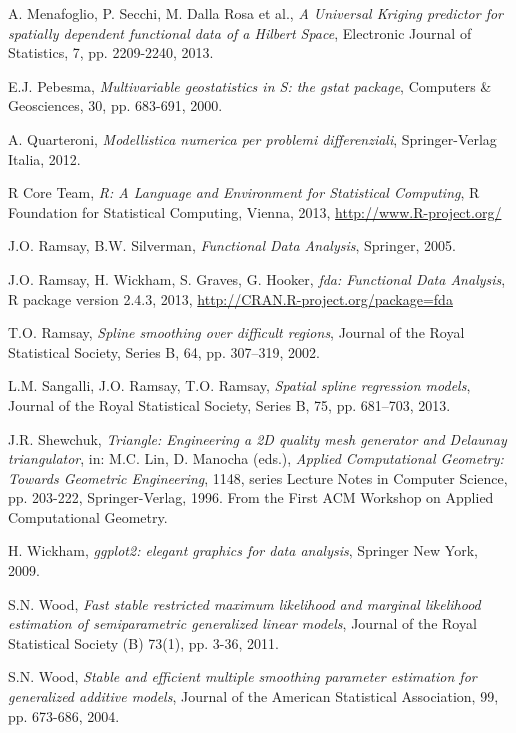 \documentclass[a4paper,11pt,twoside,openright]{book}							%
\begin{document}
\begin{thebibliography}{99}
A. Menafoglio, P. Secchi, M. Dalla Rosa et al., \emph{A Universal Kriging predictor for spatially dependent functional data of a Hilbert Space}, Electronic Journal of Statistics, 7, pp. 2209-2240, 2013.

E.J. Pebesma, \emph{Multivariable geostatistics in S: the gstat package}, Computers \& Geosciences, 30, pp. 683-691, 2000.

A. Quarteroni, \emph{Modellistica numerica per problemi differenziali}, Springer-Verlag Italia, 2012.

R Core Team, \emph{R: A Language and Environment for Statistical Computing}, R Foundation for Statistical Computing, Vienna, 2013, \href{http://www.R-project.org/}{http://www.R-project.org/}

J.O. Ramsay, B.W. Silverman, \emph{Functional Data Analysis}, Springer, 2005.

J.O. Ramsay, H. Wickham, S. Graves, G. Hooker, \emph{fda: Functional Data Analysis}, R package version 2.4.3, 2013, \href{http://CRAN.R-project.org/package=fda}{http://CRAN.R-project.org/package=fda}

T.O. Ramsay, \emph{Spline smoothing over difficult regions}, Journal of the Royal Statistical Society, Series B, 64, pp. 307–319, 2002.


L.M. Sangalli, J.O. Ramsay, T.O. Ramsay, \emph{Spatial spline regression models}, Journal of the Royal Statistical Society, Series B, 75, pp. 681–703, 2013.

J.R. Shewchuk, \emph{Triangle: Engineering a 2D quality mesh generator and Delaunay triangulator}, in: M.C. Lin, D. Manocha (eds.), \emph{Applied Computational Geometry: Towards Geometric Engineering}, 1148, series Lecture Notes in Computer Science, pp. 203-222, Springer-Verlag, 1996. From the First ACM Workshop on Applied Computational Geometry.

H. Wickham, \emph{ggplot2: elegant graphics for data analysis}, Springer New York, 2009.

S.N. Wood, \emph{Fast stable restricted maximum likelihood and marginal likelihood estimation of semiparametric generalized linear models}, Journal of the Royal Statistical Society (B) 73(1), pp. 3-36, 2011.

S.N. Wood, \emph{Stable and efficient multiple smoothing parameter estimation for generalized additive models}, Journal of the American Statistical Association, 99, pp. 673-686, 2004.


\end{thebibliography}
\end{document}
